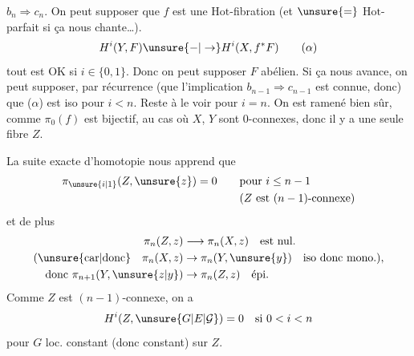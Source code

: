 $b_n\Rightarrow c_n$. On peut supposer que $f$ est une $\mathrm{Hot}$-fibration (et $\unsure{=}$ $\mathrm{Hot}$-parfait si ça nous chante\ldots).   
\[
H^i(Y,F)\unsure{-|\to} H^i(X,f^*F)
\tag*{($\alpha$)}
\]
tout est OK si $i\in\{0,1\}$. Donc on peut supposer $F$ abélien. Si ça nous avance, on peut supposer, par récurrence (que l'implication $b_{n-1}\Rightarrow c_{n-1}$ est connue, donc) que ($\alpha$) est iso pour $i<n$. Reste à le voir pour $i=n$.  On est ramené bien sûr, comme $\pi_0(f)$ est bijectif, au cas où $X$, $Y$ sont 0-connexes, donc il y a  une seule fibre $Z$.

La suite exacte d'homotopie nous  apprend que
\[
\begin{aligned}
\pi_{\unsure{i|1}}(Z,\unsure{z})=0&\qquad\text{pour }i\leq n-1\\
&\qquad(Z\ \text{est }(n-1)\text{-connexe})
\end{aligned}
\]
et de plus
\[
\begin{aligned}
\pi_n(Z,z)&\longrightarrow\pi_n(X,z)\quad\text{est nul.}\\
\text{(\unsure{car|donc}}\quad\pi_n(X,z)&\to\pi_n(Y,\unsure{y})\quad\text{iso donc mono.)},\\
\text{donc }\pi_{n+1}(Y,\unsure{z|y})&\to\pi_n(Z,z)\quad\text{épi}.
\end{aligned}
\]
Comme $Z$ est $(n-1)$-connexe,  on a
\[
H^i(Z,\unsure{G|E|\mathcal G})=0\quad\text{si }0<i<n
\]
pour $G$ loc. constant (donc constant) sur $Z$.
